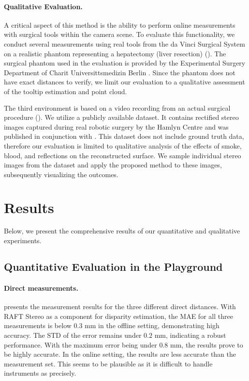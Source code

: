\documentclass[letterpaper]{article} %
\begin{document}
\paragraph{Qualitative Evaluation.} A critical aspect of this method is the ability to perform online measurements with surgical tools within the camera scene. To evaluate this functionality, we conduct several measurements using real tools from the da Vinci Surgical System on a realistic phantom representing a hepatectomy (liver resection) (). The surgical phantom used in the evaluation is provided by the Experimental Surgery Department of Charit Universittsmedizin Berlin \cite{remde_xr-developer_2023}. Since the phantom does not have exact distances to verify, we limit our evaluation to a qualitative assessment of the tooltip estimation and point cloud.

The third environment is based on a video recording from an actual surgical procedure \cite{ye_self-supervised_2017} (). We utilize a publicly available dataset. It contains rectified stereo images captured during real robotic surgery by the Hamlyn Centre and was published in conjunction with \citet{ye_self-supervised_2017}. This dataset does not include ground truth data, therefore our evaluation is limited to qualitative analysis of the effects of smoke, blood, and reflections on the reconstructed surface. We sample individual stereo images from the dataset and apply the proposed method to these images, subsequently visualizing the outcomes.

\section{Results}
\label{sec:results}

Below, we present the comprehensive results of our quantitative and qualitative experiments.

\subsection{Quantitative Evaluation in the Playground}

\paragraph{Direct measurements.}
 presents the measurement results for the three different direct distances. With RAFT Stereo as a component for disparity estimation, the MAE for all three measurements is below $0.3$ mm in the offline setting, demonstrating high accuracy. The STD of the error remains under $0.2$ mm, indicating a robust performance. With the maximum error being under 0.8 mm, the results prove to be highly accurate. In the online setting, the results are less accurate than the measurement set. This seems to be plausible as it is difficult to handle instruments as precisely.
\end{document}
